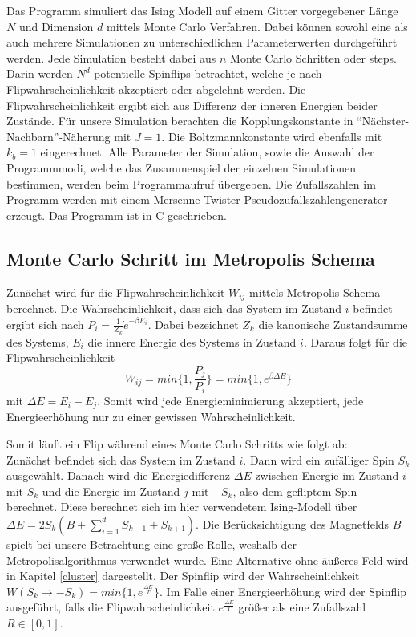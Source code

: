 
Das Programm simuliert das Ising Modell auf einem Gitter vorgegebener Länge $N$ und Dimension $d$ mittels Monte Carlo Verfahren. Dabei können sowohl eine als auch mehrere Simulationen zu unterschiedlichen Parameterwerten durchgeführt werden. Jede Simulation besteht dabei aus $n$ Monte Carlo Schritten oder steps. Darin werden $N^{d}$ potentielle Spinflips betrachtet, welche je nach Flipwahrscheinlichkeit akzeptiert oder abgelehnt werden. Die Flipwahrscheinlichkeit ergibt sich aus Differenz der inneren Energien beider Zustände. Für unsere Simulation berachten die Kopplungskonstante in “Nächster-Nachbarn”-Näherung mit $J=1$. Die Boltzmannkonstante wird ebenfalls mit $k_{b}=1$ eingerechnet. 
Alle Parameter der Simulation, sowie die Auswahl der Programmmodi, welche das Zusammenspiel der einzelnen Simulationen bestimmen, werden beim Programmaufruf übergeben. Die Zufallszahlen im Programm werden mit einem Mersenne-Twister Pseudozufallszahlengenerator erzeugt. Das Programm ist in C geschrieben.


\subsection{Monte Carlo Schritt im Metropolis Schema}

Zunächst wird für die Flipwahrscheinlichkeit $W_{ij}$ mittels Metropolis-Schema berechnet. Die Wahrscheinlichkeit, dass sich das System im Zustand $i$ befindet ergibt sich nach $P_{i}=\frac{1}{Z_{k}}\dot e^{-\beta E_{i}}$. Dabei bezeichnet $Z_{k}$ die kanonische Zustandsumme des Systems, $E_{i}$ die innere Energie des Systems in Zustand $i$. Daraus folgt für die Flipwahrscheinlichkeit
\begin{equation}
W_{ij}=min\{1,\frac{P_{j}}{P_{i}}\}=min\{1,e^{\beta \Delta E}\}
\end{equation}
mit $\Delta E=E_{i}-E_{j}$. Somit wird jede Energieminimierung akzeptiert, jede Energieerhöhung nur zu einer gewissen Wahrscheinlichkeit. 


Somit läuft ein Flip während eines Monte Carlo Schritts wie folgt ab:\\
Zunächst befindet sich das System im Zustand $i$. Dann wird ein zufälliger Spin $S_{k}$ ausgewählt. Danach wird die Energiedifferenz $\Delta E$ zwischen Energie im Zustand $i$ mit $S_{k}$ und die Energie im Zustand $j$ mit $-S_{k}$, also dem gefliptem Spin berechnet. Diese berechnet sich im hier verwendetem Ising-Modell über $\Delta E=2S_{k}(B+\sum_{i=1}^{d}S_{k-1}+S_{k+1})$. Die Berücksichtigung des Magnetfelds $B$ spielt bei unsere Betrachtung eine große Rolle, weshalb der Metropolisalgorithmus verwendet wurde. Eine Alternative ohne äußeres Feld wird in Kapitel \ref{cluster} dargestellt. Der Spinflip wird der Wahrscheinlichkeit $W(S_k \rightarrow -S_k)=min\{ 1, e^{\frac{\Delta E}{T}} \}$. Im Falle einer Energieerhöhung wird der Spinflip ausgeführt, falls die Flipwahrscheinlichkeit $e^{\frac{\Delta E}{T}}$ größer als eine Zufallszahl $R\in[0,1]$.


